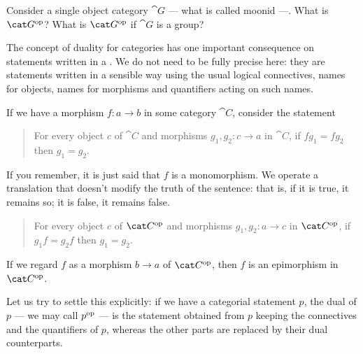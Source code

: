 \begin{exercise}
Consider a single object category \(\cat G\) --- what is called moonid ---. What is \(\opcat G\)? What is \(\opcat G\) if \(\cat G\) is a group?
\end{exercise}

The concept of duality for categories has one important consequence on statements  written in a . We do not need to be fully precise here: they are statements written in a sensible way using the usual logical connectives, names for objects, names for morphisms and quantifiers acting on such names. 

\begin{example}
If we have a morphism \(f : a \to b\) in some category \(\cat C\), consider the statement
\begin{quotation}
For every {\color{red!65!black} object \(c\) of \(\cat C\)} and {\color{blue!65!black} morphisms \(g_1, g_2 : c \to a\) in \(\cat C\)}, if {\color{green!65!black} \(f g_1 = f g_2\)} then {\color{orange!65!black}\(g_1 = g_2\)}.
\end{quotation}
If you remember, it is just said that \(f\) is a monomorphism. We operate a translation that doesn't modify the truth of the sentence: that is, if it is true, it remains so; it is false, it remains false.
\begin{quotation}
For every {\color{red!65!black} object \(c\) of \(\opcat C\)} and {\color{blue!65!black} morphisms \(g_1, g_2 : a \to c\) in \(\opcat C\)}, if {\color{green!65!black} \(g_1 f = g_2 f\)} then {\color{orange!65!black}\(g_1 = g_2\)}.
\end{quotation}
If we regard \(f\) as a morphism \(b \to a\) of \(\opcat C\), then \(f\) is an epimorphism in \(\opcat C\).
\end{example}

Let us try to settle this explicitly: if we have a categorial statement \(p\), the dual of \(p\) --- we may call \(p^\text{op}\) --- is the statement obtained from \(p\) keeping the connectives and the quantifiers of \(p\), whereas the other parts are replaced by their dual counterparts.

\begin{example}
\end{example}

